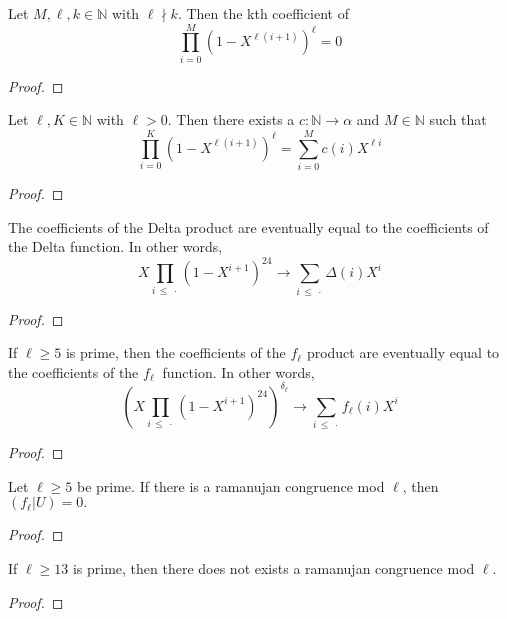 \begin{lemma}
  \label{lem:coeff_zero_of_ndvd}
  \leanok
  Let $M, \ell, k \in \mathbb{N}$ with $\ell \nmid k$. Then the kth coefficient of 
  \[ \prod_{i = 0}^{M} (1 - X ^ {\ell (i + 1)}) ^ \ell = 0 \]
\end{lemma}
\begin{proof}
  \leanok
\end{proof}

\begin{lemma}
  \label{lem:prod_eq_sum}
  \leanok
  Let $\ell, K \in \mathbb{N}$ with $\ell > 0$. Then there exists a  $c : \mathbb{N} \to \alpha$ 
  and $M \in \mathbb{N}$ such that 
  \[ \prod _{i = 0}^{K} (1 - X ^ {\ell (i + 1)}) ^ \ell = 
      \sum_{i = 0}^{M} c (i) X ^ {\ell i} \]
\end{lemma}
\begin{proof}
  \leanok
\end{proof}

\begin{theorem}
  \label{thm:DeltaProduct_eventually_sum}
  \leanok
  The coefficients of the Delta product are eventually equal to the coefficients of the Delta function.
  In other words, 
  \[ X \prod_{i \, \le \: \cdot} (1 - X ^ {i + 1}) ^ {24} \longrightarrow 
    \sum_{i \, \le \: \cdot} \Delta (i) X ^ i \]
\end{theorem}
\begin{proof}
  \leanok
\end{proof}

\begin{theorem}
  \label{thm:fl_Product_eventually_sum}
  \leanok
  If $\ell \ge 5$ is prime, then
  the coefficients of the $f_\ell$ product are eventually equal to the coefficients of the $f_\ell \:$ function.
  In other words,
  \[ (X \prod_{i \, \le \: \cdot} (1 - X ^ {i + 1}) ^ {24}) ^ {\delta_\ell} \longrightarrow 
    \sum_{i \, \le \: \cdot} f_\ell (i) X ^ i \]
\end{theorem}
\begin{proof}
  \leanok
\end{proof}


\begin{theorem} 
  \label{thm:flu_eq_zero}
  \leanok
  Let $\ell \ge 5$ be prime. If there is a ramanujan congruence mod $\ell$,
  then $(f_\ell | U) = 0.$
\end{theorem}
\begin{proof}
  \leanok
\end{proof}

\begin{theorem}
  \label{thm:MainResult}
  \leanok
  If $\ell \ge 13$ is prime, then there does not exists a ramanujan congruence mod $\ell$.
\end{theorem}
\begin{proof}
  \leanok
\end{proof}


